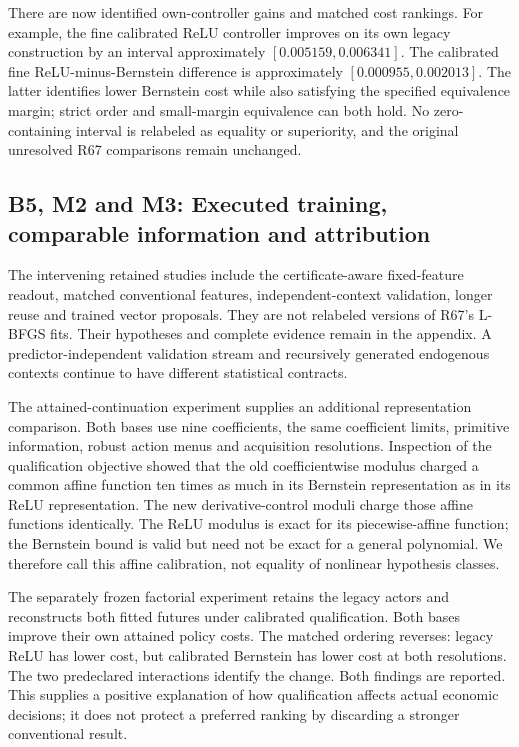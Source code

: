 There are now identified own-controller gains and matched cost rankings.
For example, the fine calibrated ReLU controller improves on its own
legacy construction by an interval approximately
\([0.005159,0.006341]\). The calibrated fine ReLU-minus-Bernstein
difference is approximately \([0.000955,0.002013]\). The latter
identifies lower Bernstein cost while also satisfying the specified
equivalence margin; strict order and small-margin equivalence can both
hold. No zero-containing interval is relabeled as equality or
superiority, and the original unresolved R67 comparisons remain
unchanged.

\hypertarget{b5-m2-and-m3-executed-training-comparable-information-and-attribution}{%
\subsection{B5, M2 and M3: Executed training, comparable information and
attribution}\label{b5-m2-and-m3-executed-training-comparable-information-and-attribution}}

The intervening retained studies include the certificate-aware
fixed-feature readout, matched conventional features,
independent-context validation, longer reuse and trained vector
proposals. They are not relabeled versions of R67's L-BFGS fits. Their
hypotheses and complete evidence remain in the appendix. A
predictor-independent validation stream and recursively generated
endogenous contexts continue to have different statistical contracts.

The attained-continuation experiment supplies an additional
representation comparison. Both bases use nine coefficients, the same
coefficient limits, primitive information, robust action menus and
acquisition resolutions. Inspection of the qualification objective
showed that the old coefficientwise modulus charged a common affine
function ten times as much in its Bernstein representation as in its
ReLU representation. The new derivative-control moduli charge those
affine functions identically. The ReLU modulus is exact for its
piecewise-affine function; the Bernstein bound is valid but need not be
exact for a general polynomial. We therefore call this affine
calibration, not equality of nonlinear hypothesis classes.

The separately frozen factorial experiment retains the legacy actors and
reconstructs both fitted futures under calibrated qualification. Both
bases improve their own attained policy costs. The matched ordering
reverses: legacy ReLU has lower cost, but calibrated Bernstein has lower
cost at both resolutions. The two predeclared interactions identify the
change. Both findings are reported. This supplies a positive explanation
of how qualification affects actual economic decisions; it does not
protect a preferred ranking by discarding a stronger conventional
result.

